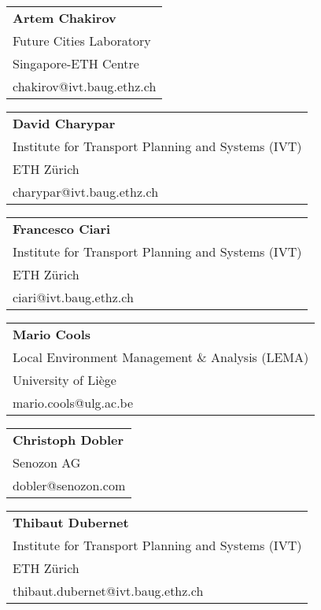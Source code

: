 \begin{tabular}[width=0.48\textwidth]{@{}l}
\textbf{Artem Chakirov} \\
Future Cities Laboratory \\
Singapore-ETH Centre\\
chakirov@ivt.baug.ethz.ch \\
\end{tabular}

\begin{tabular}[width=0.48\textwidth]{@{}l}
\textbf{David Charypar} \\
Institute for Transport Planning and Systems (IVT) \\
ETH Zürich \\
charypar@ivt.baug.ethz.ch \\
\end{tabular}

\begin{tabular}[width=0.48\textwidth]{@{}l}
\textbf{Francesco Ciari} \\
Institute for Transport Planning and Systems (IVT) \\
ETH Zürich \\
ciari@ivt.baug.ethz.ch \\
\end{tabular}

\begin{tabular}[width=0.48\textwidth]{@{}l}
\textbf{Mario Cools} \\
Local Environment Management \& Analysis (LEMA) \\
University of Liège \\
mario.cools@ulg.ac.be \\
\end{tabular}

\begin{tabular}[width=0.48\textwidth]{@{}l}
\textbf{Christoph Dobler} \\
Senozon AG \\
dobler@senozon.com \\
\end{tabular}

\begin{tabular}[width=0.48\textwidth]{@{}l}
\textbf{Thibaut Dubernet} \\
Institute for Transport Planning and Systems (IVT) \\
ETH Zürich \\
thibaut.dubernet@ivt.baug.ethz.ch \\
\end{tabular}

